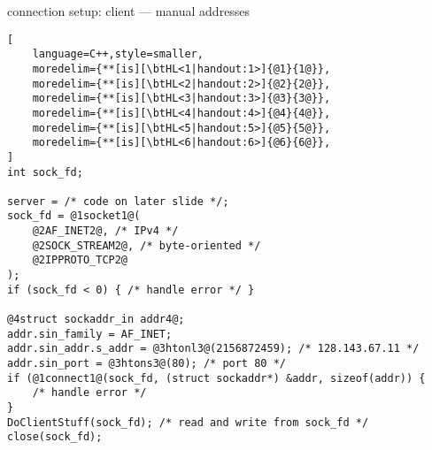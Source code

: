 \begin{frame}[fragile,label=connSetupClientManual]{connection setup: client --- manual addresses}
\begin{lstlisting}[
    language=C++,style=smaller,
    moredelim={**[is][\btHL<1|handout:1>]{@1}{1@}},
    moredelim={**[is][\btHL<2|handout:2>]{@2}{2@}},
    moredelim={**[is][\btHL<3|handout:3>]{@3}{3@}},
    moredelim={**[is][\btHL<4|handout:4>]{@4}{4@}},
    moredelim={**[is][\btHL<5|handout:5>]{@5}{5@}},
    moredelim={**[is][\btHL<6|handout:6>]{@6}{6@}},
]
int sock_fd;

server = /* code on later slide */;
sock_fd = @1socket1@(
    @2AF_INET2@, /* IPv4 */
    @2SOCK_STREAM2@, /* byte-oriented */
    @2IPPROTO_TCP2@
);
if (sock_fd < 0) { /* handle error */ }

@4struct sockaddr_in addr4@;
addr.sin_family = AF_INET;
addr.sin_addr.s_addr = @3htonl3@(2156872459); /* 128.143.67.11 */
addr.sin_port = @3htons3@(80); /* port 80 */
if (@1connect1@(sock_fd, (struct sockaddr*) &addr, sizeof(addr)) {
    /* handle error */
}
DoClientStuff(sock_fd); /* read and write from sock_fd */
close(sock_fd);
\end{lstlisting}
\end{frame}
